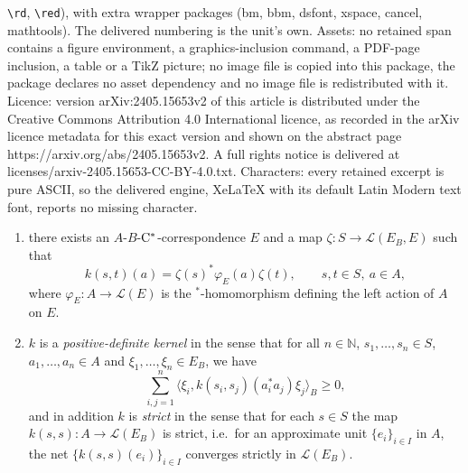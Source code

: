 \documentclass[10pt,a4paper]{amsart}
\renewcommand{\L}{\mathcal L}
\newcommand{\N}{\mathbb N}
\newcommand{\cst}{\ifmmode\mathrm{C}^*\else{$\mathrm{C}^*$}\fi}
\begin{document}
\texttt{\textbackslash rd}, \texttt{\textbackslash red}), with extra wrapper packages (bm, bbm, dsfont, xspace, cancel, mathtools). The delivered numbering is the unit's own. Assets: no retained span contains a figure environment, a graphics-inclusion command, a PDF-page inclusion, a table or a TikZ picture; no image file is copied into this package, the package declares no asset dependency and no image file is redistributed with it. Licence: version arXiv:2405.15653v2 of this article is distributed under the Creative Commons Attribution 4.0 International licence, as recorded in the arXiv licence metadata for this exact version and shown on the abstract page https://arxiv.org/abs/2405.15653v2. A full rights notice is delivered at licenses/arxiv-2405.15653-CC-BY-4.0.txt. Characters: every retained excerpt is pure ASCII, so the delivered engine, XeLaTeX with its default Latin Modern text font, reports no missing character.
\begin{enumerate}
    \item\label{enu:Murphy_Stinespring2} there exists an $A$-$B$-$\cst$-correspondence $E$  and a map $\zeta:S \to \L(E_B,E)$ such that 
    \[ 
        k(s,t)(a) =  \zeta(s)^* \varphi_E(a) \zeta(t),\qquad   s, t \in S,\  a \in A,
    \]
    where $\varphi_E:A\to \L(E)$ is the $^*$-homomorphism defining the left action of $A$ on $E$.
    \item\label{enu:Murphy_Stinespring1} $k$ is a \emph{positive-definite kernel} in the sense that for all $n \in \N$, $s_1,\ldots, s_n \in S$, $a_1, \ldots ,a_n\in A$ and $\xi_1, \ldots, \xi_n \in E_B$, we have
    \[
        \sum_{i,j=1}^n \langle \xi_i, k(s_i,s_j) (a_i^*a_j)\xi_j\rangle_B \geq 0,
    \]
    and in addition $k$ is \emph{strict} in the sense that for each $s\in S$ the map $k(s,s):A\to \L(E_B)$ is strict, i.e.\ for an approximate unit $\{e_i\}_{i \in I}$ in $A$, the net $\{k(s,s)(e_i)\}_{i \in I}$ converges strictly in $\L(E_B)$.
\end{enumerate}
\end{document}
